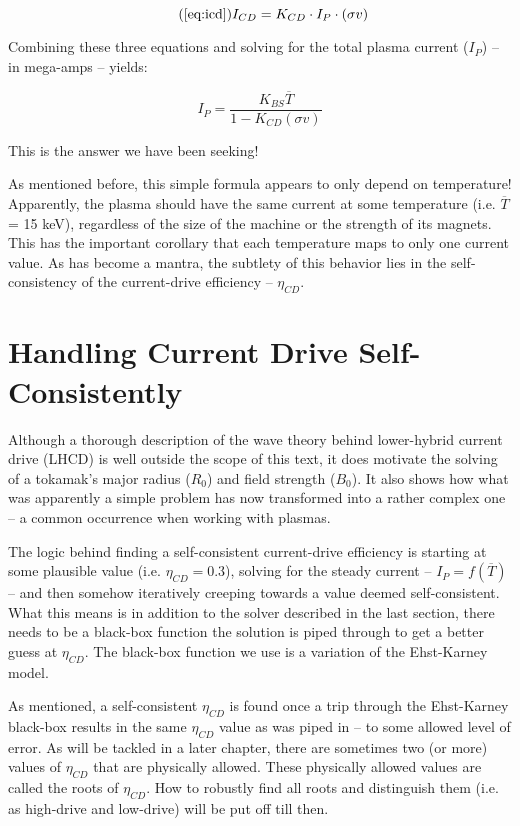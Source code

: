 \begin{equation}
	\tag{\ref{eq:icd}}
	I_{CD} = K_{CD} \cdot I_P \cdot ( \sigma v )
\end{equation}

Combining these three equations and solving for the total plasma current ($I_P$) -- in mega-amps -- yields:

\begin{equation}
	I_P = \frac{ K_{BS} \overline T }{ 1 - K_{CD} ( \sigma v ) }
\end{equation}

This is the answer we have been seeking!

As mentioned before, this simple formula appears to only depend on temperature! Apparently, the plasma should have the same current at some temperature (i.e. $\overline T$ = 15 keV), regardless of the size of the machine or the strength of its magnets. This has the important corollary that each temperature maps to only one current value. As has become a mantra, the subtlety of this behavior lies in the self-consistency of the current-drive efficiency -- $\eta_{CD}$.

\section{Handling Current Drive Self-Consistently}

Although a thorough description of the wave theory behind lower-hybrid current drive (LHCD) is well outside the scope of this text, it does motivate the solving of a tokamak's major radius ($R_0$) and field strength ($B_0$). It also shows how what was apparently a simple problem has now transformed into a rather complex one -- a common occurrence when working with plasmas.

The logic behind finding a self-consistent current-drive efficiency is starting at some plausible value (i.e. $\eta_{CD} = 0.3$), solving for the steady current -- $I_P = f(\overline T)$ -- and then somehow iteratively creeping towards a value deemed self-consistent. What this means is in addition to the solver described in the last section, there needs to be a black-box function the solution is piped through to get a better guess at $\eta_{CD}$. The black-box function we use is a variation of the Ehst-Karney model.

As mentioned, a self-consistent $\eta_{CD}$ is found once a trip through the Ehst-Karney black-box results in the same $\eta_{CD}$ value as was piped in -- to some allowed level of error. As will be tackled in a later chapter, there are sometimes two (or more) values of $\eta_{CD}$ that are physically allowed. These physically allowed values are called the roots of $\eta_{CD}$. How to robustly find all roots and distinguish them (i.e. as high-drive and low-drive) will be put off till then.

